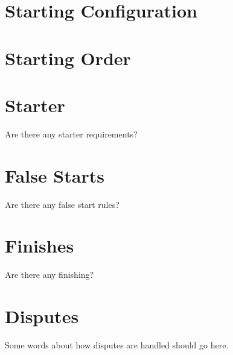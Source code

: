 \section{Starting Configuration}

\section{Starting Order}

\section{Starter}

\begin{framed}
Are there any starter requirements?
\end{framed}

\section{False Starts}

\begin{framed}
Are there any false start rules?
\end{framed}

\section{Finishes}

\begin{framed}
Are there any finishing?
\end{framed}

\section{Disputes}

\begin{framed}
Some words about how disputes are handled should go here.
\end{framed}
